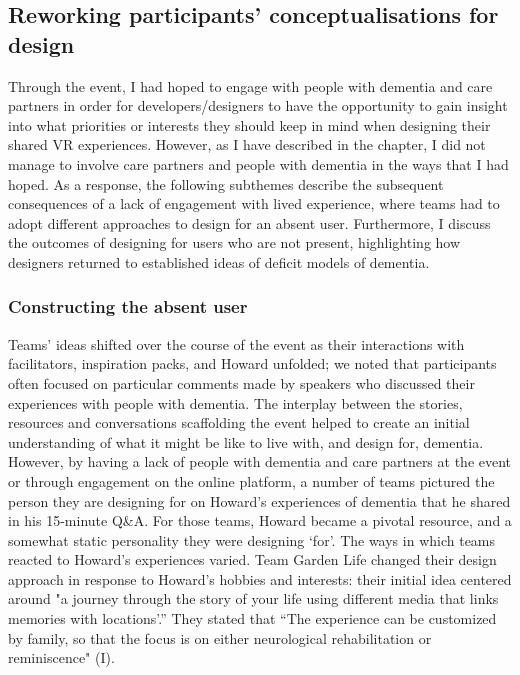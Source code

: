 \subsection{Reworking participants' conceptualisations for design}
\label{LearningEvent:ThemeTwo}
Through the event, I had hoped to engage with people with dementia and care partners in order for developers/designers to have the opportunity to gain insight into what priorities or interests they should keep in mind when designing their shared VR experiences. However, as I have described in the chapter, I did not manage to involve care partners and people with dementia in the ways that I had hoped. As a response, the following subthemes describe the subsequent consequences of a lack of engagement with lived experience, where teams had to adopt different approaches to design for an absent user. Furthermore, I discuss the outcomes of designing for users who are not present, highlighting how designers returned to established ideas of deficit models of dementia. 

\subsubsection{Constructing the absent user}
\label{ThemeTwo:subthemeOne}
Teams’ ideas shifted over the course of the event as their interactions with facilitators, inspiration packs, and Howard unfolded; we noted that participants often focused on particular comments made by speakers who discussed their experiences with people with dementia. The interplay between the stories, resources and conversations scaffolding the event helped to create an initial understanding of what it might be like to live with, and design for, dementia. However, by having a lack of people with dementia and care partners at the event or through engagement on the online platform, a number of teams pictured the person they are designing for on Howard’s experiences of dementia that he shared in his 15-minute Q\&A. For those teams, Howard became a pivotal resource, and a somewhat static personality they were designing ‘for’. The ways in which teams reacted to Howard’s experiences varied. Team Garden Life changed their design approach in response to Howard's hobbies and interests: their initial idea centered around "a journey through the story of your life using different media that links memories with locations'.” They stated that “The experience can be customized by family, so that the focus is on either neurological rehabilitation or reminiscence" (I). 

